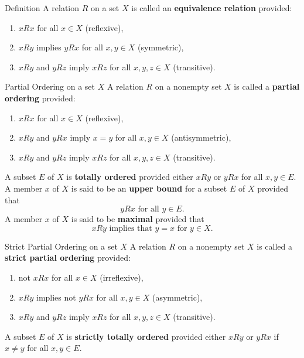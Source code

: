 \documentclass[a4paper,10pt]{book}
\theoremstyle{plain} %
\newcommand{\thistheoremname}{}
\newtheorem*{genericthm*}{\thistheoremname}
\newenvironment{namedthm*}[1]
	{\renewcommand{\thistheoremname}{#1}%
	\begin{genericthm*}}
	{\end{genericthm*}}
\begin{document}
\begin{flushleft}

\begin{namedthm*}{Definition}
A relation $R$ on a set $X$ is called an \textbf{equivalence relation} provided:
\begin{enumerate}[label=(\roman*),align=left]
	\item $xRx$ for all $x \in X$ (reflexive),
	\item $xRy$ implies $yRx$ for all $x,y \in X$ (symmetric),
	\item $xRy$ and $yRz$ imply $xRz$ for all $x,y,z \in X$ (transitive).
\end{enumerate}
\end{namedthm*}
\bigskip

\begin{namedthm*}{Partial Ordering on a set $X$}
A relation $R$ on a nonempty set $X$ is called a \textbf{partial ordering} provided:
\begin{enumerate}[label=(\roman*),align=left]
	\item $xRx$ for all $x \in X$ (reflexive),
	\item $xRy$ and $yRx$ imply $x=y$ for all $x,y \in X$ (antisymmetric),
	\item $xRy$ and $yRz$ imply $xRz$ for all $x,y,z \in X$ (transitive).
\end{enumerate}
A subset $E$ of $X$ is \textbf{totally ordered} provided either $xRy$ or $yRx$ for all $x,y \in E$.
A member $x$ of $X$ is said to be an \textbf{upper bound} for a subset $E$ of $X$ provided that 
\[ yRx \text{ for all } y \in E.\]
A member $x$ of $X$ is said to be \textbf{maximal} provided that 
\[ xRy \text{ implies that } y =x \text{ for } y \in X.\]
\end{namedthm*}
\medskip

\begin{namedthm*}{Strict Partial Ordering on a set $X$}
A relation $R$ on a nonempty set $X$ is called a \textbf{strict partial ordering} provided:
\begin{enumerate}[label=(\roman*),align=left]
	\item not $xRx$ for all $x \in X$ (irreflexive),
	\item $xRy$ implies not $yRx$ for all $x,y \in X$ (asymmetric),
	\item $xRy$ and $yRz$ imply $xRz$ for all $x,y,z \in X$ (transitive).
\end{enumerate}
A subset $E$ of $X$ is \textbf{strictly totally ordered} provided either $xRy$ or $yRx$ if $x\neq y$ for all $x,y \in E$.\par
\end{namedthm*}



\end{flushleft}
\end{document}
